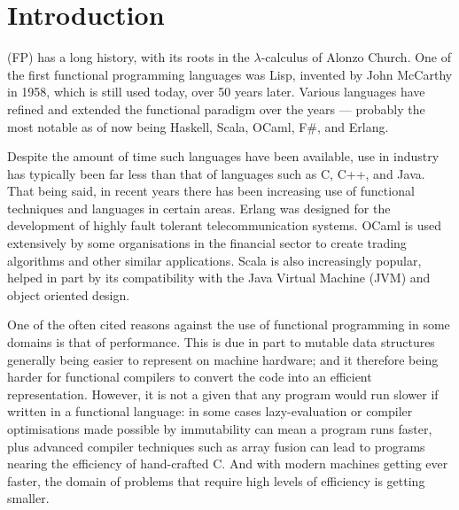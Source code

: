 \chapter[Introduction]{Introduction}
\label{ch:motivation}


 (FP) has a long history, with its roots in the $\lambda$-calculus of Alonzo Church. One of the first functional programming languages was Lisp, invented by John McCarthy in 1958, which is still used today, over 50 years later. Various languages have refined and extended the functional paradigm over the years --- probably the most notable as of now being Haskell, Scala, OCaml, F\#, and Erlang.

Despite the amount of time such languages have been available, use in industry has typically been far less than that of languages such as C, C++, and Java. That being said, in recent years there has been increasing use of functional techniques and languages in certain areas. Erlang was designed for the development of highly fault tolerant telecommunication systems.\cite[-1em]{armstrong2007history} OCaml is used extensively by some organisations in the financial sector to create trading algorithms and other similar applications. Scala is also increasingly popular, helped in part by its compatibility with the Java Virtual Machine (JVM) and object oriented design.

One of the often cited reasons against the use of functional programming in some domains is that of performance. This is due in part to mutable data structures generally being easier to represent on machine hardware; and it therefore being harder for functional compilers to convert the code into an efficient representation. However, it is not a given that any program would run slower if written in a functional language: in some cases lazy-evaluation or compiler optimisations made possible by immutability can mean a program runs faster, plus advanced compiler techniques such as array fusion can lead to programs nearing the efficiency of hand-crafted C. And with modern machines getting ever faster, the domain of problems that require high levels of efficiency is getting smaller.

